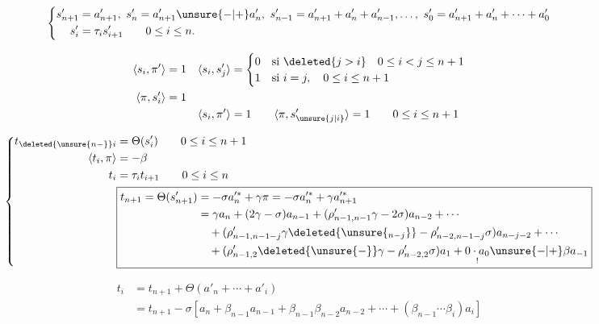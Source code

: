 \[
\left\{\begin{aligned}
s'_{n+1}&=a'_{n+1},\ s'_n=a'_{n+1}\unsure{-|+}a'_n,\ s'_{n-1}=a'_{n+1}+a'_n+a'_{n-1},\ldots,\ s'_0=a'_{n+1}+a'_n+\cdots+a'_0\\
s'_i&=\tau_i s'_{i+1}\qquad0\le i\le n.
\end{aligned}\right.
\]

\[
\begin{aligned}
\langle s_i,\pi'\rangle&=1&\langle s_i,s'_j\rangle&=\begin{cases}0&\text{si }\deleted{j>i}\quad0\le i<j\le n+1\\1&\text{si }i=j,\quad0\le i\le n+1\end{cases}\\
\langle\pi,s'_i\rangle&=1\\
&&\langle s_i,\pi'\rangle&=1\qquad\langle\pi,s'_{\unsure{j|i}}\rangle=1\qquad0\le i\le n+1
\end{aligned}
\]


\[
\left\{\begin{aligned}
t_{\deleted{\unsure{n-}}i}&=\Theta(s'_i)\qquad0\le i\le n+1\\
\langle t_i,\pi\rangle&=-\beta\\
t_i&=\tau_i t_{i+1}\qquad0\le i\le n\\
&\boxed{\begin{aligned}
t_{n+1}=\Theta(s'_{n+1})&=-\sigma a_n^{\prime *}+\gamma\pi=-\sigma a_n^{\prime *}+\gamma a_{n+1}^{\prime *}\\
&=\gamma a_n+(2\gamma-\sigma)a_{n-1}+(\rho'_{n-1,n-1}\gamma-2\sigma)a_{n-2}+\cdots\\
&\quad+(\rho'_{n-1,n-1-j}\gamma\deleted{\unsure{_{n-j}}}-\rho'_{n-2,n-1-j}\sigma)a_{n-j-2}+\cdots\\
&\quad+(\rho'_{n-1,2}\deleted{\unsure{-}}\gamma-\rho'_{n-2,2}\sigma)a_1+\underset{!}{0\cdot a_0}\unsure{-|+}\beta a_{-1}
\end{aligned}}
\end{aligned}\right.
\]

\[
\begin{aligned}
t_i&=t_{n+1}+\Theta(a'_n+\cdots+a'_i)\\
&=t_{n+1}-\sigma[a_n+\beta_{n-1}a_{n-1}+\beta_{n-1}\beta_{n-2}a_{n-2}+\cdots+(\beta_{n-1}\cdots\beta_i)a_i]
\end{aligned}
\]

